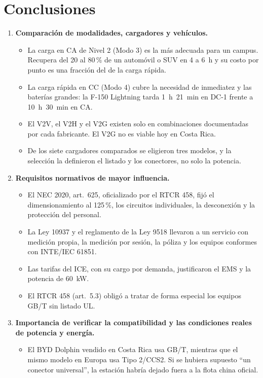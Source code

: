 \section{Conclusiones}
\begin{enumerate}
\item \textbf{Comparación de modalidades, cargadores y vehículos.}
  \begin{itemize}
  \item La carga en CA de Nivel 2 (Modo 3) es la más adecuada para un campus. Recupera del 20 al 80\,\% de un automóvil o SUV en 4 a 6~h y su costo por punto es una fracción del de la carga rápida.
  \item La carga rápida en CC (Modo 4) cubre la necesidad de inmediatez y las baterías grandes: la F-150 Lightning tarda 1~h~21~min en DC-1 frente a 10~h~30~min en CA.
  \item El V2V, el V2H y el V2G existen solo en combinaciones documentadas por cada fabricante. El V2G no es viable hoy en Costa Rica.
  \item De los siete cargadores comparados se eligieron tres modelos, y la selección la definieron el listado y los conectores, no solo la potencia.
  \end{itemize}
\item \textbf{Requisitos normativos de mayor influencia.}
  \begin{itemize}
  \item El NEC 2020, art.~625, oficializado por el RTCR 458, fijó el dimensionamiento al 125\,\%, los circuitos individuales, la desconexión y la protección del personal.
  \item La Ley 10937 y el reglamento de la Ley 9518 llevaron a un servicio con medición propia, la medición por sesión, la póliza y los equipos conformes con INTE/IEC 61851.
  \item Las tarifas del ICE, con su cargo por demanda, justificaron el EMS y la potencia de 60~kW.
  \item El RTCR 458 (art.~5.3) obligó a tratar de forma especial los equipos GB/T sin listado UL.
  \end{itemize}
\item \textbf{Importancia de verificar la compatibilidad y las condiciones reales de potencia y energía.}
  \begin{itemize}
  \item El BYD Dolphin vendido en Costa Rica usa GB/T, mientras que el mismo modelo en Europa usa Tipo 2/CCS2. Si se hubiera supuesto ``un conector universal'', la estación habría dejado fuera a la flota china oficial.

\end{itemize}
\end{enumerate}
